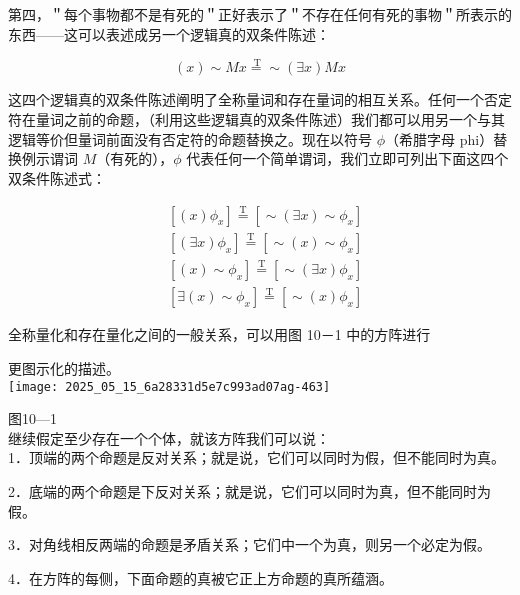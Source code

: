 第四，＂每个事物都不是有死的＂正好表示了＂不存在任何有死的事物＂所表示的东西——这可以表述成另一个逻辑真的双条件陈述：

$$
(x) \sim M x \stackrel{\mathrm{~T}}{=} \sim(\exists x) M x
$$

这四个逻辑真的双条件陈述阐明了全称量词和存在量词的相互关系。任何一个否定符在量词之前的命题，（利用这些逻辑真的双条件陈述）我们都可以用另一个与其逻辑等价但量词前面没有否定符的命题替换之。现在以符号 $\phi$（希腊字母 phi）替换例示谓词 $M$（有死的），$\phi$ 代表任何一个简单谓词，我们立即可列出下面这四个双条件陈述式：

$$
\begin{aligned}
& {\left[(x) \phi_{x}\right] \stackrel{\mathrm{T}}{=}\left[\sim(\exists x) \sim \phi_{x}\right]} \\
& {\left[(\exists x) \phi_{x}\right] \stackrel{\mathrm{T}}{=}\left[\sim(x) \sim \phi_{x}\right]} \\
& {\left[(x) \sim \phi_{x}\right] \stackrel{\mathrm{T}}{=}\left[\sim(\exists x) \phi_{x}\right]} \\
& {\left[\exists(x) \sim \phi_{x}\right] \stackrel{\mathrm{T}}{=}\left[\sim(x) \phi_{x}\right]}
\end{aligned}
$$

全称量化和存在量化之间的一般关系，可以用图 10－1 中的方阵进行

更图示化的描述。\\
\texttt{[image: 2025\_05\_15\_6a28331d5e7c993ad07ag-463]}

图10—1\\
继续假定至少存在一个个体，就该方阵我们可以说：\\
1．顶端的两个命题是反对关系；就是说，它们可以同时为假，但不能同时为真。

2．底端的两个命题是下反对关系；就是说，它们可以同时为真，但不能同时为假。

3．对角线相反两端的命题是矛盾关系；它们中一个为真，则另一个必定为假。

4．在方阵的每侧，下面命题的真被它正上方命题的真所蕴涵。 